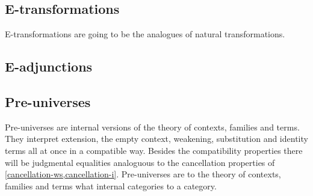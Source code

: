 \subsection{E-transformations}
E-transformations are going to be the analogues of natural transformations.

\subsection{E-adjunctions}

\subsection{Pre-universes}
Pre-universes are internal versions of the theory of contexts, families and
terms. They interpret extension, the empty context, weakening, substitution
and identity terms all at once in a compatible way. Besides the compatibility
properties there will be judgmental equalities analoguous to the cancellation
properties of \autoref{cancellation-ws,cancellation-i}. Pre-universes are to
the theory of contexts, families and terms what internal categories to a
category.
